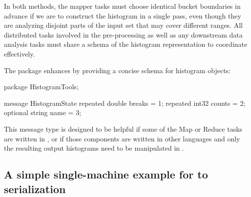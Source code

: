 \documentclass[article]{jss}
\begin{document}
In both methods, the mapper tasks must choose identical bucket
boundaries in advance if we are to construct the histogram in a single
pass, even though they are analyzing disjoint parts of the input set
that may cover different ranges.  All distributed tasks involved in
the pre-processing as well as any downstream data analysis tasks must
share a schema of the histogram representation to coordinate
effectively.

The  package \citep{histogramtools} enhances
 by providing a concise schema for 
histogram objects:
%
\begin{example}
package HistogramTools;

message HistogramState {
  repeated double breaks = 1;
  repeated int32 counts = 2;
  optional string name = 3;
}
\end{example}
%
This  message type is designed to be helpful if
some of the Map or Reduce tasks are written in , or if
those components are written in other languages and only the resulting
output histograms need to be manipulated in .

\subsection[A simple single-machine example for Python to R
serialization]{A simple single-machine example for 
  to  serialization}
\end{document}
